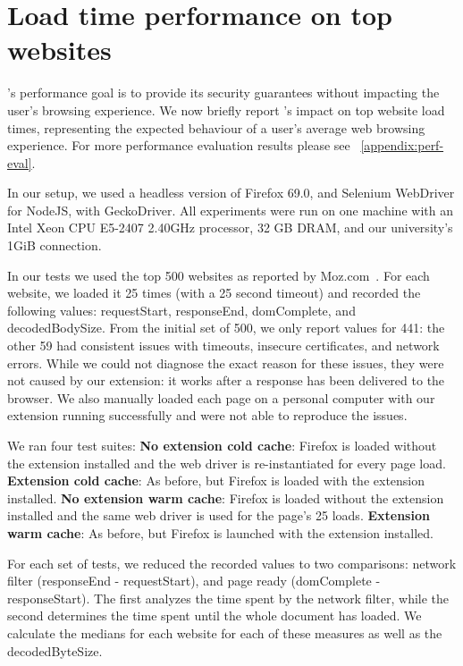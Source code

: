 \section{Load time performance on top websites} \label{performance}

\sys's performance goal is to provide its security guarantees without
impacting the user's browsing experience. We now briefly report \sys's
impact on top website load times, representing the expected behaviour
of a user's average web browsing experience. For more performance
evaluation results please see ~\autoref{appendix:perf-eval}.

% 
In our setup, we used a headless version of Firefox 69.0, and
Selenium WebDriver for NodeJS, with GeckoDriver. All experiments were
run on one machine with an Intel Xeon CPU E5-2407 2.40GHz processor,
32 GB DRAM, and our university's 1GiB connection.

In our tests we used the top 500 websites as
reported by Moz.com~\cite{top500}. For each website, we loaded it 25
times (with a 25 second timeout) and recorded the following values:
requestStart, responseEnd, domComplete, and decodedBodySize. From the
initial set of 500, we only report values for 441: the other 59 had
consistent issues with timeouts, insecure certificates, and network
errors. While we could not 
diagnose the exact reason for these issues, they were not
caused by our extension: it works after a response has been
delivered to the browser. We also manually loaded each page
on a personal computer with our extension running successfully and 
were not able to reproduce the issues.

We ran four test suites:
\textbf{No extension cold cache}: Firefox is loaded without the extension installed and the web driver is re-instantiated for every page load.
\textbf{Extension cold cache}: As before, but Firefox is loaded with the extension installed.
\textbf{No extension warm cache}: Firefox is loaded without the extension installed and the same web driver is used for the page's 25 loads.
\textbf{Extension warm cache}: As before, but Firefox is launched with the extension installed.

For each set of tests, we reduced the recorded values to two comparisons: network filter (responseEnd - requestStart), and page ready (domComplete - responseStart). The first analyzes the time spent by the network filter, while the second determines the time spent until the whole document has loaded. We calculate the medians for each website for each of these measures as well as the decodedByteSize.

